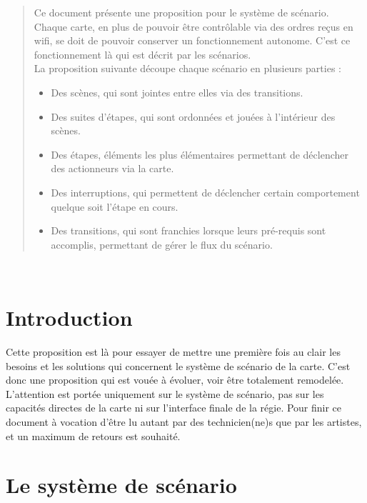 \newpage
\thispagestyle{empty}
\begin{abstract}
Ce document présente une proposition pour le système de scénario.\\
Chaque carte, en plus de pouvoir être contrôlable via des ordres reçus en wifi, se doit de pouvoir conserver un fonctionnement autonome. C'est ce fonctionnement là qui est décrit par les scénarios.\\
La proposition suivante découpe chaque scénario en plusieurs parties :
\begin{itemize}
\item Des scènes, qui sont jointes entre elles via des transitions.
\item Des suites d'étapes, qui sont ordonnées et jouées à l'intérieur des scènes.
\item Des étapes, éléments les plus élémentaires permettant de déclencher des actionneurs via la carte.
\item Des interruptions, qui permettent de déclencher certain comportement quelque soit l'étape en cours.
\item Des transitions, qui sont franchies lorsque leurs pré-requis sont accomplis, permettant de gérer le flux du scénario.

\end{itemize}
\end{abstract}

\newpage
~ \thispagestyle{empty}

\tableofcontents

\newpage

\setcounter{page}{1}

\section{Introduction}
Cette proposition est là pour essayer de mettre une première fois au clair les besoins et les solutions qui concernent le système de scénario de la carte. C'est donc une proposition qui est vouée à évoluer, voir être totalement remodelée.\p
L'attention est portée uniquement sur le système de scénario, pas sur les capacités directes de la carte ni sur l'interface finale de la régie. Pour finir ce document à vocation d'être lu autant par des technicien(ne)s que par les artistes, et un maximum de retours est souhaité.

\section{Le système de scénario}

